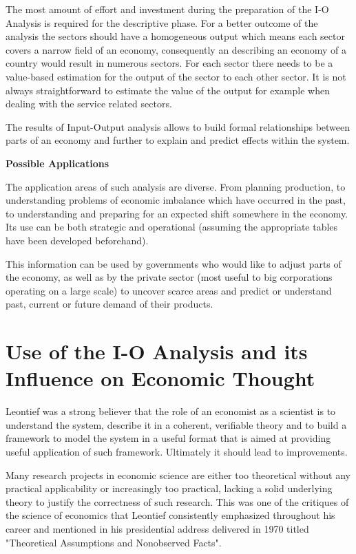 \documentclass[12pt,a4paper]{scrartcl}
\begin{document}
	The most amount of effort and investment during the preparation of the I-O Analysis is required for the descriptive phase. For a better outcome of the analysis the sectors should have a homogeneous output which means each sector covers a narrow field of an economy, consequently an describing an economy of a country would result in numerous sectors. For each sector there needs to be a value-based estimation for the output of the sector to each other sector. It is not always straightforward to estimate the value of the output for example when dealing with the service related sectors.
	
	The results of Input-Output analysis allows to build formal relationships between parts of an economy and further to explain and predict effects within the system. \cite[]{InvestopediaIO} \cite[pp.137-138]{christ1955review}
	
	\textbf{Possible Applications}
	
	The application areas of such analysis are diverse. From planning production, to understanding problems of economic imbalance which have occurred in the past, to understanding and preparing for an expected shift somewhere in the economy. Its use can be both strategic and operational (assuming the appropriate tables have been developed beforehand).
	
	This information can be used by governments who would like to adjust parts of the economy, as well as by the private sector (most useful to big corporations operating on a large scale) to uncover scarce areas and predict or understand past, current or future demand of their products.
	
	

	
	\section{Use of the I-O Analysis and its Influence on Economic Thought}  \label{contribution}
	
	Leontief was a strong believer that the role of an economist as a scientist is to understand the system, describe it in a coherent, verifiable theory and to build a framework to model the system in a useful format that is aimed at providing useful application of such framework. Ultimately it should lead to improvements.
	
	Many research projects in economic science are either too theoretical without any practical applicability or increasingly too practical, lacking a solid underlying theory to justify the correctness of such research. This was one of the critiques of the science of economics that Leontief consistently emphasized throughout his career and mentioned in his presidential address delivered in 1970 titled "Theoretical Assumptions and Nonobserved Facts". \cite[]{Leontief1971}
	
\end{document}
